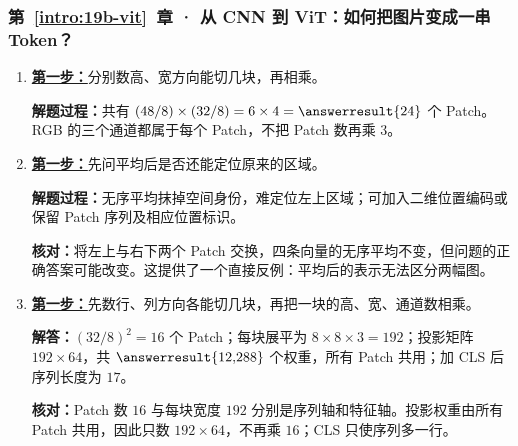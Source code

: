\subsubsection*{第~\ref*{intro:19b-vit}~章 · 从 CNN 到 ViT：如何把图片变成一串 Token？}
\begin{enumerate}[label={},leftmargin=4.8em,itemsep=4pt]
\item[\textbf{C-121.}] \leavevmode{}\label{solution:C-121}\label{solution:rectangular-patch-count}\hyperref[exercise:rectangular-patch-count]{\textbf{第一步：}}分别数高、宽方向能切几块，再相乘。\par\nobreak
\textbf{解题过程：}共有 $(48/8)\times(32/8)=6\times4=\answerresult{24}$ 个 Patch。RGB 的三个通道都属于每个 Patch，不把 Patch 数再乘 $3$。
\item[\textbf{C-122.}] \leavevmode{}\label{solution:C-122}\label{solution:vit-spatial-order}\hyperref[exercise:vit-spatial-order]{\textbf{第一步：}}先问平均后是否还能定位原来的区域。\par\nobreak\textbf{解题过程：}无序平均抹掉空间身份，难定位左上区域；可加入二维位置编码或保留 Patch 序列及相应位置标识。\par\textbf{核对：}将左上与右下两个 Patch 交换，四条向量的无序平均不变，但问题的正确答案可能改变。这提供了一个直接反例：平均后的表示无法区分两幅图。
\item[\textbf{C-123.}] \leavevmode{}\label{solution:C-123}\label{solution:patch-projection-count}\hyperref[exercise:patch-projection-count]{\textbf{第一步：}}先数行、列方向各能切几块，再把一块的高、宽、通道数相乘。\par\nobreak
\textbf{解答：}$(32/8)^2=16$ 个 Patch；每块展平为 $8\times8\times3=192$；投影矩阵 $192\times64$，共 $\answerresult{12{,}288}$ 个权重，所有 Patch 共用；加 CLS 后序列长度为 $17$。\par\textbf{核对：}Patch 数 $16$ 与每块宽度 $192$ 分别是序列轴和特征轴。投影权重由所有 Patch 共用，因此只数 $192\times64$，不再乘 $16$；CLS 只使序列多一行。
\end{enumerate}
